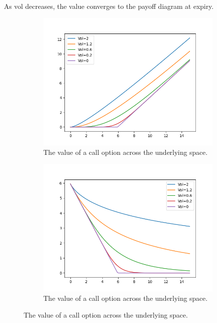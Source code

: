 \documentclass{article}
\begin{document}
    \begin{theorem}
      As vol decreases, the value converges to the payoff diagram at expiry.
      \begin{figure}[H]
        \centering
        \begin{subfigure}[b]{0.48\textwidth}
        \centering
          \includegraphics[width=\textwidth]{img/bs_call_wrt_vol.png}
          \caption{The value of a call option across the underlying space. }
          \label{fig:bs_call_wrt_vol}
        \end{subfigure}
        \hfill 
        \begin{subfigure}[b]{0.48\textwidth}
        \centering
          \includegraphics[width=\textwidth]{img/bs_put_wrt_vol.png}
          \caption{The value of a call option across the underlying space. }
          \label{fig:bs_put_wrt_vol}
        \end{subfigure}
        \label{fig:bs_wrt_vol}
      \end{figure}
    \end{theorem}
\end{document}
